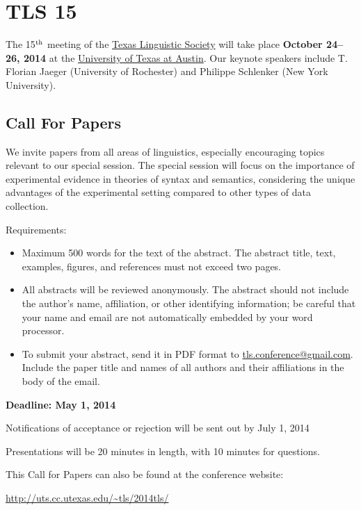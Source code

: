 \documentclass[11pt]{article}
\begin{document}
\clearpage\thispagestyle{empty}

\section*{TLS 15}

The 15$^{{\rm th}}$ meeting of the \href{http://uts.cc.utexas.edu/~tls}{Texas Linguistic Society} will take place \textbf{October 24--26, 2014} at the \href{https://www.utexas.edu/cola/depts/linguistics/}{University of Texas at Austin}. Our keynote speakers include T. Florian Jaeger (University of Rochester) and Philippe Schlenker (New York University).

\subsection*{Call For Papers}

We invite papers from all areas of linguistics, especially encouraging topics relevant to our special session. The special session will focus on the importance of experimental evidence in theories of syntax and semantics, considering the unique advantages of the experimental setting compared to other types of data collection.

\medskip\noindent
Requirements:

\begin{itemize}
  \item Maximum 500 words for the text of the abstract. The abstract title, text, examples, figures, and references must not exceed two pages.
  \item All abstracts will be reviewed anonymously. The abstract should not include the author’s name, affiliation, or other identifying information; be careful that your name and email are not automatically embedded by your word processor.
  \item To submit your abstract, send it in PDF format to \href{mailto:tls.conference@gmail.com}{tls.conference@gmail.com}. Include the paper title and names of all authors and their affiliations in the body of the email.
\end{itemize}

\textbf{Deadline: May 1, 2014}

\medskip\noindent
Notifications of acceptance or rejection will be sent out by July 1, 2014

\medskip\noindent
Presentations will be 20 minutes in length, with 10 minutes for questions.

\medskip\noindent
This Call for Papers can also be found at the conference website:

\smallskip
\url{http://uts.cc.utexas.edu/~tls/2014tls/}
\end{document}
